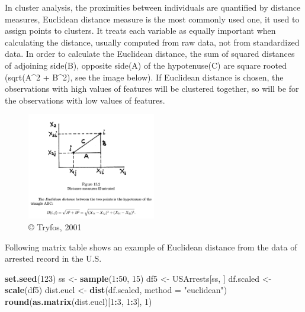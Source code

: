 \documentclass[]{book}
\newenvironment{Shaded}{\begin{snugshade}}{\end{snugshade}}
\newcommand{\DataTypeTok}[1]{\textcolor[rgb]{0.13,0.29,0.53}{#1}}
\newcommand{\DecValTok}[1]{\textcolor[rgb]{0.00,0.00,0.81}{#1}}
\newcommand{\KeywordTok}[1]{\textcolor[rgb]{0.13,0.29,0.53}{\textbf{#1}}}
\newcommand{\NormalTok}[1]{#1}
\newcommand{\OperatorTok}[1]{\textcolor[rgb]{0.81,0.36,0.00}{\textbf{#1}}}
\newcommand{\StringTok}[1]{\textcolor[rgb]{0.31,0.60,0.02}{#1}}
\begin{document}
In cluster analysis, the proximities between individuals are quantified by distance measures, Euclidean distance measure is the most commonly used one, it used to assign points to clusters. It treats each variable as equally important when calculating the distance, usually computed from raw data, not from standardized data. In order to calculate the Euclidean distance, the sum of squared distances of adjoining side(B), opposite side(A) of the hypotenuse(C) are square rooted (sqrt(A\^{}2 + B\^{}2), see the image below). If Euclidean distance is chosen, the observations with high values of features will be clustered together, so will be for the observations with low values of features.

\begin{figure}
\centering
\includegraphics[width=0.5\textwidth,height=\textheight]{Euclidean.png}
\caption{© Tryfos, 2001}
\end{figure}

Following matrix table shows an example of Euclidean distance from the data of arrested record in the U.S.

\begin{Shaded}
\begin{Highlighting}[]
\KeywordTok{set.seed}\NormalTok{(}\DecValTok{123}\NormalTok{)}
\NormalTok{ss <-}\StringTok{ }\KeywordTok{sample}\NormalTok{(}\DecValTok{1}\OperatorTok{:}\DecValTok{50}\NormalTok{, }\DecValTok{15}\NormalTok{)}
\NormalTok{df5 <-}\StringTok{ }\NormalTok{USArrests[ss, ] }
\NormalTok{df.scaled <-}\StringTok{ }\KeywordTok{scale}\NormalTok{(df5) }
\NormalTok{dist.eucl <-}\StringTok{ }\KeywordTok{dist}\NormalTok{(df.scaled, }\DataTypeTok{method =} \StringTok{"euclidean"}\NormalTok{)}
\KeywordTok{round}\NormalTok{(}\KeywordTok{as.matrix}\NormalTok{(dist.eucl)[}\DecValTok{1}\OperatorTok{:}\DecValTok{3}\NormalTok{, }\DecValTok{1}\OperatorTok{:}\DecValTok{3}\NormalTok{], }\DecValTok{1}\NormalTok{)}
\end{Highlighting}
\end{Shaded}
\end{document}
